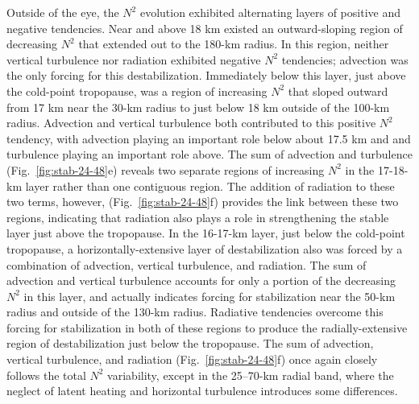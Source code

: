 \documentclass{ametsoc}
\begin{document}
Outside of the eye, the $N^2$ evolution exhibited alternating layers of positive and negative tendencies.
Near and above 18 km existed an outward-sloping region of decreasing $N^2$ that extended out to the 180-km radius.
In this region, neither vertical turbulence nor radiation exhibited negative $N^2$ tendencies; advection was the only forcing for this destabilization.
Immediately below this layer, just above the cold-point tropopause, was a region of increasing $N^2$ that sloped outward from 17 km near the 30-km radius to just below 18 km outside of the 100-km radius.
Advection and vertical turbulence both contributed to this positive $N^2$ tendency, with advection playing an important role below about 17.5 km and and turbulence playing an important role above.
The sum of advection and turbulence (Fig.~\ref{fig:stab-24-48}e) reveals two separate regions of increasing $N^2$ in the 17-18-km layer rather than one contiguous region.
The addition of radiation to these two terms, however, (Fig.~\ref{fig:stab-24-48}f) provides the link between these two regions, indicating that radiation also plays a role in strengthening the stable layer just above the tropopause.
In the 16-17-km layer, just below the cold-point tropopause, a horizontally-extensive layer of destabilization also was forced by a combination of advection, vertical turbulence, and radiation.
The sum of advection and vertical turbulence accounts for only a portion of the decreasing $N^2$ in this layer, and actually indicates forcing for stabilization near the 50-km radius and outside of the 130-km radius.
Radiative tendencies overcome this forcing for stabilization in both of these regions to produce the radially-extensive region of destabilization just below the tropopause. The sum of advection, vertical turbulence, and radiation (Fig.~\ref{fig:stab-24-48}f) once again closely follows the total $N^2$ variability, except in the 25--70-km radial band, where the neglect of latent heating and horizontal turbulence introduces some differences.
\end{document}
